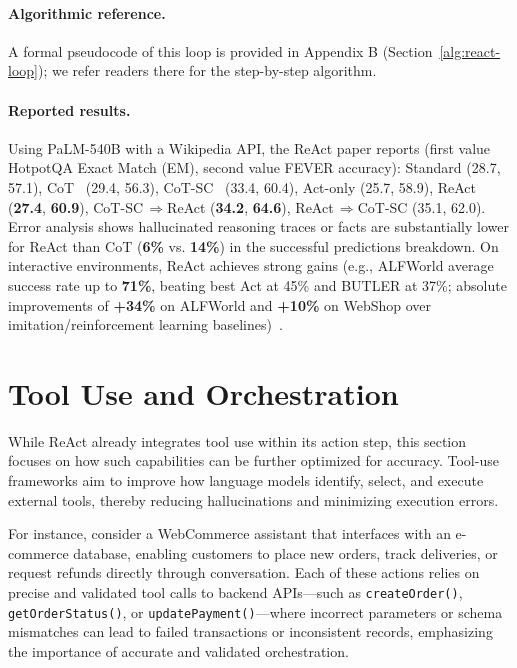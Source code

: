 \paragraph{Algorithmic reference.} A formal pseudocode of this loop is provided in Appendix B (Section~\ref{alg:react-loop}); we refer readers there for the step-by-step algorithm.

\paragraph{Reported results.} Using PaLM-540B with a Wikipedia API, the ReAct paper reports (first value HotpotQA Exact Match (EM), second value FEVER accuracy): Standard (28.7, 57.1), CoT~\cite{chainofthought} (29.4, 56.3), CoT-SC~\cite{chainofthought} (33.4, 60.4), Act-only (25.7, 58.9), ReAct (\textbf{27.4}, \textbf{60.9}), CoT-SC$\,\Rightarrow$ReAct (\textbf{34.2}, \textbf{64.6}), ReAct$\,\Rightarrow$CoT-SC (35.1, 62.0). Error analysis shows hallucinated reasoning traces or facts are substantially lower for ReAct than CoT (\textbf{6\%} vs. \textbf{14\%}) in the successful predictions breakdown. On interactive environments, ReAct achieves strong gains (e.g., ALFWorld average success rate up to \textbf{71\%}, beating best Act at 45\% and BUTLER at 37\%; absolute improvements of \textbf{+34\%} on ALFWorld and \textbf{+10\%} on WebShop over imitation/reinforcement learning baselines)~\cite{react}.


\section{Tool Use and Orchestration}

While ReAct already integrates tool use within its action step, this section focuses on how such capabilities can be further optimized for accuracy.  
Tool-use frameworks aim to improve how language models identify, select, and execute external tools, thereby reducing hallucinations and minimizing execution errors.  

For instance, consider a WebCommerce assistant that interfaces with an e-commerce database, enabling customers to place new orders, track deliveries, or request refunds directly through conversation.
Each of these actions relies on precise and validated tool calls to backend APIs—such as \texttt{createOrder()}, \texttt{getOrderStatus()}, or \texttt{updatePayment()}—where incorrect parameters or schema mismatches can lead to failed transactions or inconsistent records, emphasizing the importance of accurate and validated orchestration. 

